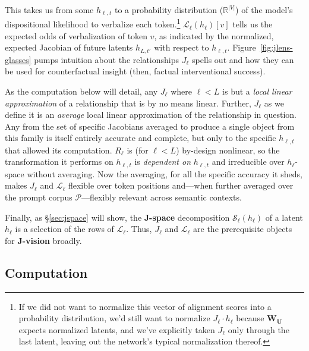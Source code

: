 \documentclass{article}
\newcommand{\jlens}{\mathscr{L}}
\newcommand{\jspace}{\mathscr{S}}
\begin{document}
This takes us from some \(h_{\ell,t}\) to a probability distribution (\(\mathbb{R}^{|V|}\)) of the model's dispositional likelihood to verbalize each token.\footnote{If we did not want to normalize this vector of alignment scores into a probability distribution, we'd still want to normalize \(J_\ell \cdot h_\ell\) because \(\mathbf{W_U}\) expects normalized latents, and we've explicitly taken \(J_\ell\) only through the last latent, leaving out the network's typical normalization thereof.} \(\jlens_\ell(h_\ell)[v]\) tells us the expected odds of verbalization of token \(v\), as indicated by the normalized, expected Jacobian of future latents \(h_{L,t'}\) with respect to \(h_{\ell,t}\). Figure~\ref{fig:jlens-glasses} pumps intuition about the relationships \(J_\ell\) spells out and how they can be used for counterfactual insight (then, factual interventional success). 

As the computation below will detail, any \(J_\ell\) where \(\ell < L\) is but a \textit{local linear approximation} of a relationship that is by no means linear. Further, \(J_\ell\) as we define it is an \textit{average} local linear approximation of the relationship in question. Any from the set of specific Jacobians averaged to produce a single object from this family is itself entirely accurate and complete, but only to the specific \(h_{\ell,t}\) that allowed its computation. \(R_\ell\) is (for \(\ell < L\)) by-design nonlinear, so the transformation it performs on \(h_{\ell,t}\) is \textit{dependent on} \(h_{\ell,t}\) and irreducible over \(h_{\ell}\)-space without averaging. Now the averaging, for all the specific accuracy it sheds, makes \(J_{\ell}\) and \(\jlens_\ell\) flexible over token positions and---when further averaged over the prompt corpus \(\mathscr{P}\)---flexibly relevant across semantic contexts. 

Finally, as \S\ref{sec:jspace} will show, the \textbf{J-space} decomposition \(\jspace_{\ell}(h_\ell)\) of a latent \(h_{\ell}\) is a selection of the rows of \(\jlens_{\ell}\). Thus, \(J_{\ell}\) and \(\jlens_{\ell}\) are the prerequisite objects for \textbf{J-vision} broadly.

\subsection{Computation}\label{sec:jcomp}
\end{document}
